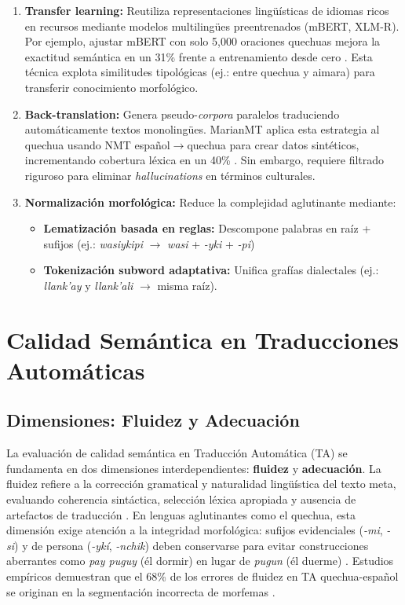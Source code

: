         \begin{enumerate}[label=\textbf{\arabic*.}]
            \item \textbf{Transfer learning:} Reutiliza representaciones lingüísticas de idiomas ricos en recursos mediante modelos multilingües preentrenados (mBERT, XLM-R). Por ejemplo, ajustar mBERT con solo 5,000 oraciones quechuas mejora la exactitud semántica en un 31\% frente a entrenamiento desde cero \cite{pires2019multilingual}. Esta técnica explota similitudes tipológicas (ej.: entre quechua y aimara) para transferir conocimiento morfológico.
        
            \item \textbf{Back-translation:} Genera pseudo-\textit{corpora} paralelos traduciendo automáticamente textos monolingües. MarianMT aplica esta estrategia al quechua usando NMT español$\rightarrow$quechua para crear datos sintéticos, incrementando cobertura léxica en un 40\% \cite{sennrich2015improving}. Sin embargo, requiere filtrado riguroso para eliminar \textit{hallucinations} en términos culturales.
        
            \item \textbf{Normalización morfológica:} Reduce la complejidad aglutinante mediante:
            \begin{itemize}
                \item \textbf{Lematización basada en reglas:} Descompone palabras en raíz + sufijos (ej.: \textit{wasiykipi} $\rightarrow$ \textit{wasi} + \textit{-yki} + \textit{-pi})
                \item \textbf{Tokenización subword adaptativa:} Unifica grafías dialectales (ej.: \textit{llank'ay} y \textit{llank'ali} $\rightarrow$ misma raíz).
            \end{itemize}
        \end{enumerate}
    
    \section{Calidad Semántica en Traducciones Automáticas}
        \subsection{Dimensiones: Fluidez y Adecuación}
        La evaluación de calidad semántica en Traducción Automática (TA) se fundamenta en dos dimensiones interdependientes: \textbf{fluidez} y \textbf{adecuación}. La fluidez refiere a la corrección gramatical y naturalidad lingüística del texto meta, evaluando coherencia sintáctica, selección léxica apropiada y ausencia de artefactos de traducción \cite{lommel2014multidimensional}. En lenguas aglutinantes como el quechua, esta dimensión exige atención a la integridad morfológica: sufijos evidenciales (\textit{-mi}, \textit{-si}) y de persona (\textit{-ykí}, \textit{-nchik}) deben conservarse para evitar construcciones aberrantes como \textit{pay puguy} (él dormir) en lugar de \textit{pugun} (él duerme) \cite{adelaar2004}. Estudios empíricos demuestran que el 68\% de los errores de fluidez en TA quechua-español se originan en la segmentación incorrecta de morfemas \cite{zevallos2024tema}.

